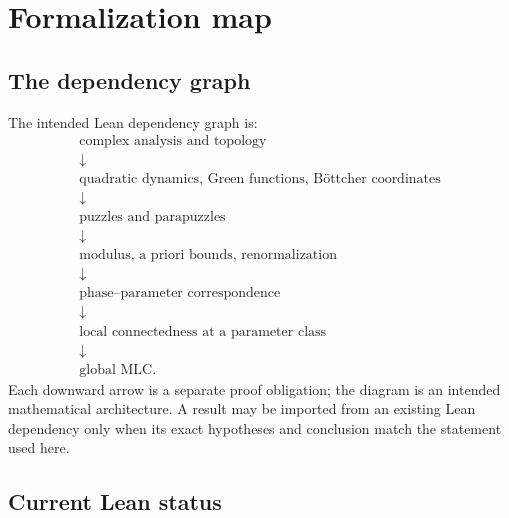 \chapter{Formalization map}
\label{ch:formal-map}

\section{The dependency graph}

The intended Lean dependency graph is:
\[
\begin{array}{c}
\text{complex analysis and topology}\\
\downarrow\\
\text{quadratic dynamics, Green functions, Böttcher coordinates}\\
\downarrow\\
\text{puzzles and parapuzzles}\\
\downarrow\\
\text{modulus, a priori bounds, renormalization}\\
\downarrow\\
\text{phase--parameter correspondence}\\
\downarrow\\
\text{local connectedness at a parameter class}\\
\downarrow\\
\text{global MLC}.
\end{array}
\]
Each downward arrow is a separate proof obligation; the diagram is
an intended mathematical architecture.  A result may be
imported from an existing Lean dependency only when its exact hypotheses and
conclusion match the statement used here.

\section{Current Lean status}

